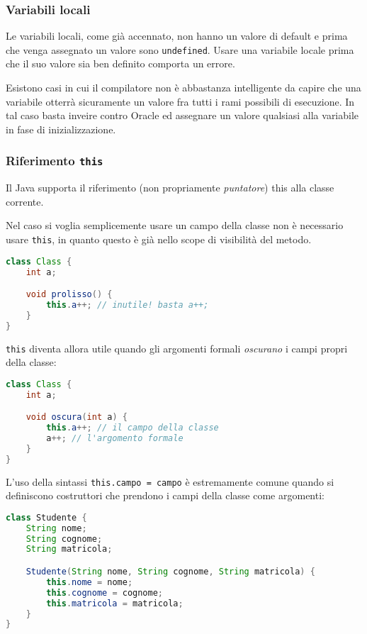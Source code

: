 \documentclass[a4paper,11pt]{article}
\begin{document}
\subsubsection{Variabili locali}
Le variabili locali, come già accennato, non hanno un valore di default e prima che venga assegnato un valore sono \lstinline|undefined|.
Usare una variabile locale prima che il suo valore sia ben definito comporta un errore.

Esistono casi in cui il compilatore non è abbastanza intelligente da capire che una variabile otterrà sicuramente un valore fra tutti i rami possibili di esecuzione.
In tal caso basta inveire contro Oracle ed assegnare un valore qualsiasi alla variabile in fase di inizializzazione.

\subsubsection{Riferimento \lstinline|this|}
Il Java supporta il riferimento (non propriamente \textit{puntatore}) this alla classe corrente.

Nel caso si voglia semplicemente usare un campo della classe non è necessario usare \lstinline|this|, in quanto questo è già nello scope di visibilità del metodo.

\begin{lstlisting}[language=java, style=codestyle]	
class Class {
	int a;

	void prolisso() {
		this.a++; // inutile! basta a++;
	}
}
\end{lstlisting}

\lstinline|this| diventa allora utile quando gli argomenti formali \textit{oscurano} i campi propri della classe:

\begin{lstlisting}[language=java, style=codestyle]	
class Class {
	int a;

	void oscura(int a) {
		this.a++; // il campo della classe
		a++; // l'argomento formale
	}
}
\end{lstlisting}

L'uso della sintassi \lstinline|this.campo = campo| è estremamente comune quando si definiscono costruttori che prendono i campi della classe come argomenti:
\begin{lstlisting}[language=java, style=codestyle]	
class Studente {
	String nome;
	String cognome;
	String matricola;

	Studente(String nome, String cognome, String matricola) {
		this.nome = nome;
		this.cognome = cognome;
		this.matricola = matricola;
	}
}
\end{lstlisting}
\end{document}

